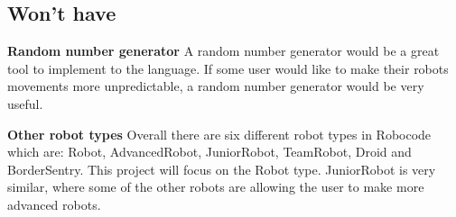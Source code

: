 \subsection{Won't have} 
\textbf{Random number generator}
A random number generator would be a great tool to implement to the language. If some user would like to make their robots movements more unpredictable, a random number generator would be very useful.

\textbf{Other robot types} 
Overall there are six different robot types in Robocode which are: Robot, AdvancedRobot, JuniorRobot, TeamRobot, Droid and BorderSentry. This project will focus on the Robot type. JuniorRobot is very similar, where some of the other robots are allowing the user to make more advanced robots. 